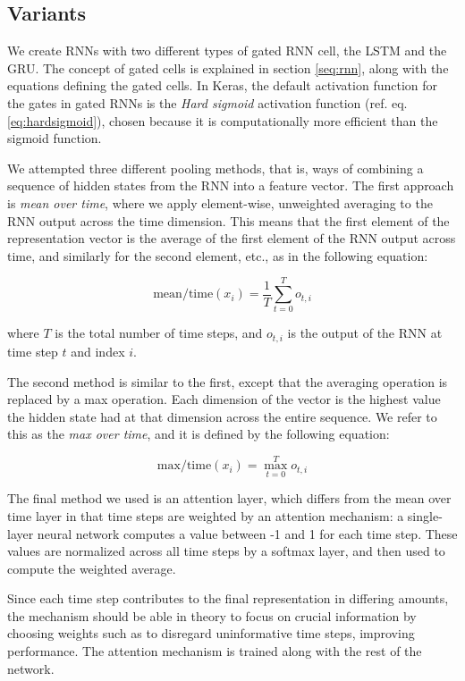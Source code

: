 \subsection{Variants}

We create \acp{RNN} with two different types of gated \ac{RNN} cell, the
\ac{LSTM} and the \ac{GRU}. The concept of gated cells is explained in
section \ref{seq:rnn}, along with the equations defining the gated cells. In
Keras, the default activation function for the gates in gated RNNs is the
\emph{Hard sigmoid} activation function (ref. eq. \ref{eq:hardsigmoid}),
chosen because it is computationally more efficient than the sigmoid
function.

We attempted three different pooling methods, that is, ways of combining a
sequence of hidden states from the \ac{RNN} into a feature vector. The first
approach is \emph{mean over time}, where we apply element-wise, unweighted
averaging to the RNN output across the time dimension. This means that the
first element of the representation vector is the average of the first
element of the RNN output across time, and similarly for the second element,
etc., as in the following equation:

\[
  \mathrm{mean/time}(x_i) = \frac{1}{T}\sum_{t=0}^T o_{t,i}
\]

where $T$ is the total number of time steps, and $o_{t,i}$ is the output of
the RNN at time step $t$ and index $i$.

The second method is similar to the first, except that the averaging
operation is replaced by a max operation. Each dimension of the vector is the
highest value the hidden state had at that dimension across the entire
sequence. We refer to this as the \emph{max over time}, and it is defined by
the following equation:

\[
  \mathrm{max/time}(x_i) = \max_{t=0}^T o_{t,i}
\]

The final method we used is an attention layer, which differs from the mean
over time layer in that time steps are weighted by an attention mechanism: a
single-layer neural network computes a value between -1 and 1 for each time
step. These values are normalized across all time steps by a softmax layer,
and then used to compute the weighted average.

Since each time step contributes to the final representation in differing
amounts, the mechanism should be able in theory to focus on crucial
information by choosing weights such as to disregard uninformative time
steps, improving performance. The attention mechanism is trained along with
the rest of the network.

